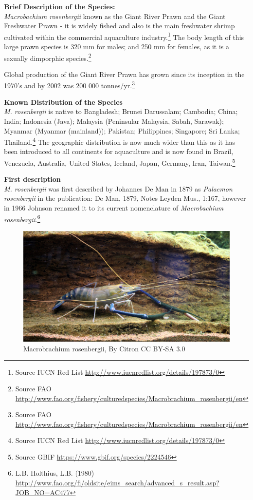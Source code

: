 \documentclass[]{book}
\let\rmarkdownfootnote\footnote%
\def\footnote{\protect\rmarkdownfootnote}
\theoremstyle{definition}
\theoremstyle{definition}
\theoremstyle{definition}
\theoremstyle{remark}
\begin{document}
\textbf{Brief Description of the Species:}\\
\emph{Macrobachium rosenbergii} known as the Giant River Prawn and the
Giant Freshwater Prawn - it is widely fished and also is the main
freshwater shrimp cultivated within the commercial aquaculture
industry.\footnote{Source IUCN Red List
  \url{http://www.iucnredlist.org/details/197873/0}} The body length of
this large prawn species is 320 mm for males; and 250 mm for females, as
it is a sexually dimporphic species.\footnote{Source FAO
  \url{http://www.fao.org/fishery/culturedspecies/Macrobrachium_rosenbergii/en}}

Global production of the Giant River Prawn has grown since its inception
in the 1970's and by 2002 was 200 000 tonnes/yr.\footnote{Source FAO
  \url{http://www.fao.org/fishery/culturedspecies/Macrobrachium_rosenbergii/en}}

\textbf{Known Distribution of the Species}\\
\emph{M. rosenbergii} is native to Bangladesh; Brunei Darussalam;
Cambodia; China; India; Indonesia (Java); Malaysia (Peninsular Malaysia,
Sabah, Sarawak); Myanmar (Myanmar (mainland)); Pakistan; Philippines;
Singapore; Sri Lanka; Thailand.\footnote{Source IUCN Red List
  \url{http://www.iucnredlist.org/details/197873/0}} The geographic
distribution is now much wider than this as it has been introduced to
all continents for aquaculture and is now found in Brazil, Venezuela,
Australia, United States, Iceland, Japan, Germany, Iran,
Taiwan.\footnote{Source GBIF \url{https://www.gbif.org/species/2224546}}

\textbf{First description}\\
\emph{M. rosenbergii} was first described by Johannes De Man in 1879 as
\emph{Palaemon rosenbergii} in the publication: De Man, 1879, Notes
Leyden Mus., 1:167, however in 1966 Johnson renamed it to its current
nomenclature of \emph{Macrobachium rosenbergii}.\footnote{L.B. Holthius,
  L.B. (1980)
  \url{http://www.fao.org/fi/oldsite/eims_search/advanced_s_result.asp?JOB_NO=AC477}}

\begin{figure}

{\centering \includegraphics[width=29.17in]{images_species/Macrobrachium_rosenbergii} 

}

\caption{Macrobrachium rosenbergii, By Citron CC BY-SA 3.0}\label{fig:unnamed-chunk-5}
\end{figure}
\end{document}
